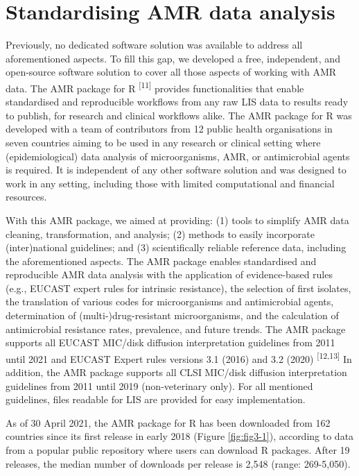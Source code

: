 \documentclass[
]{book}
\begin{document}
\hypertarget{standardising-amr-data-analysis}{%
\section{Standardising AMR data analysis}\label{standardising-amr-data-analysis}}

Previously, no dedicated software solution was available to address all aforementioned aspects. To fill this gap, we developed a free, independent, and open-source software solution to cover all those aspects of working with AMR data. The AMR package for R \textsuperscript{{[}11{]}} provides functionalities that enable standardised and reproducible workflows from any raw LIS data to results ready to publish, for research and clinical workflows alike. The AMR package for R was developed with a team of contributors from 12 public health organisations in seven countries aiming to be used in any research or clinical setting where (epidemiological) data analysis of microorganisms, AMR, or antimicrobial agents is required. It is independent of any other software solution and was designed to work in any setting, including those with limited computational and financial resources.

With this AMR package, we aimed at providing: (1) tools to simplify AMR data cleaning, transformation, and analysis; (2) methods to easily incorporate (inter)national guidelines; and (3) scientifically reliable reference data, including the aforementioned aspects. The AMR package enables standardised and reproducible AMR data analysis with the application of evidence-based rules (e.g., EUCAST expert rules for intrinsic resistance), the selection of first isolates, the translation of various codes for microorganisms and antimicrobial agents, determination of (multi-)drug-resistant microorganisms, and the calculation of antimicrobial resistance rates, prevalence, and future trends. The AMR package supports all EUCAST MIC/disk diffusion interpretation guidelines from 2011 until 2021 and EUCAST Expert rules versions 3.1 (2016) and 3.2 (2020) \textsuperscript{{[}12,13{]}} In addition, the AMR package supports all CLSI MIC/disk diffusion interpretation guidelines from 2011 until 2019 (non-veterinary only). For all mentioned guidelines, files readable for LIS are provided for easy implementation.

As of 30 April 2021, the AMR package for R has been downloaded from 162 countries since its first release in early 2018 (Figure \ref{fig:fig3-1}), according to data from a popular public repository where users can download R packages. After 19 releases, the median number of downloads per release is 2,548 (range: 269-5,050).
\end{document}
